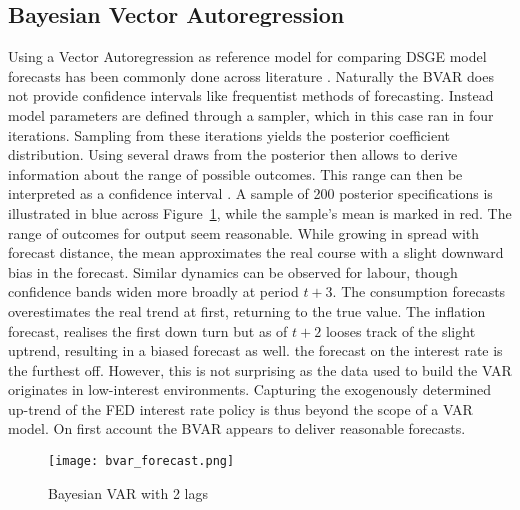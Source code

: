 \documentclass[12pt,a4paper,english]{article} %
\begin{document}
	\subsection{Bayesian Vector Autoregression} \label{forecast_bvar}
	Using a Vector Autoregression as reference model for comparing DSGE model forecasts has been commonly done across literature \cite{schorfheide_loss_2000, chin_bayesian_2019}. 
	Naturally the BVAR does not provide confidence intervals like frequentist methods of forecasting. Instead model parameters are defined through a sampler, which in this case ran in four iterations. Sampling from these iterations yields the posterior coefficient distribution. Using several draws from the posterior then allows to derive information about the range of possible outcomes. This range can then be interpreted as a confidence interval \cite{chin_bayesian_2019}. A sample of 200 posterior specifications is illustrated in blue across Figure~\ref{fig:bvar}, while the sample's mean is marked in red. 
	The range of outcomes for output seem reasonable. While growing in spread with forecast distance, the mean approximates the real course with a slight downward bias in the forecast. Similar dynamics can be observed for labour, though confidence bands widen more broadly at period $t+3$. The consumption forecasts overestimates the real trend at first, returning to the true value. The inflation forecast, realises the first down turn but as of $t+2$ looses track of the slight uptrend, resulting in a biased forecast as well. the forecast on the interest rate is the furthest off. However, this is not surprising as the data used to build the VAR originates in low-interest environments. Capturing the exogenously determined up-trend of the FED interest rate policy is thus beyond the scope of a VAR model. On first account the BVAR appears to deliver reasonable forecasts. 
	\begin{figure}[H]
		\begin{center}
			\texttt{[image: bvar\_forecast.png]}
			\caption{Bayesian VAR with 2 lags}\label{fig:bvar}
		\end{center}
	\end{figure}
	
\end{document}
